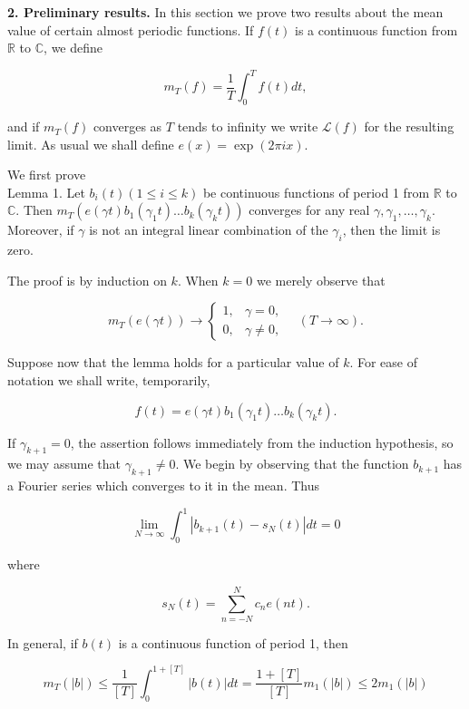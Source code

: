\documentclass[10pt]{article}
\newcommand{\articleSection}[2]{%
  \par\medskip\noindent\textbf{#1. #2.}\enspace
}
\begin{document}
\articleSection{2}{Preliminary results}In this section we prove two results about the mean value of certain almost periodic functions. If $f(t)$ is a continuous function from $\mathbb{R}$ to $\mathbb{C}$, we define

$$
m_{T}(f)=\frac{1}{T} \int_{0}^{T} f(t) d t,
$$

and if $m_{T}(f)$ converges as $T$ tends to infinity we write $\mathcal{L}(f)$ for the resulting limit. As usual we shall define $e(x)=\exp (2 \pi i x)$.

We first prove\\
Lemma 1. Let $b_{i}(t)(1 \leq i \leq k)$ be continuous functions of period 1 from $\mathbb{R}$ to $\mathbb{C}$. Then $m_{T}\left(e(\gamma t) b_{1}\left(\gamma_{1} t\right) \ldots b_{k}\left(\gamma_{k} t\right)\right)$ converges for any real $\gamma, \gamma_{1}, \ldots, \gamma_{k}$. Moreover, if $\gamma$ is not an integral linear combination of the $\gamma_{i}$, then the limit is zero.

The proof is by induction on $k$. When $k=0$ we merely observe that

$$
m_{T}(e(\gamma t)) \rightarrow
\begin{cases}
1, & \gamma=0, \\
0, & \gamma \neq 0,
\end{cases}
\quad(T \rightarrow \infty).
$$

Suppose now that the lemma holds for a particular value of $k$. For ease of notation we shall write, temporarily,

$$
f(t)=e(\gamma t) b_{1}\left(\gamma_{1} t\right) \ldots b_{k}\left(\gamma_{k} t\right) .
$$

If $\gamma_{k+1}=0$, the assertion follows immediately from the induction hypothesis, so we may assume that $\gamma_{k+1}\neq 0$. We begin by observing that the function $b_{k+1}$ has a Fourier series which converges to it in the mean. Thus

$$
\lim _{N \rightarrow \infty} \int_{0}^{1}\left|b_{k+1}(t)-s_{N}(t)\right| d t=0
$$

where


\begin{equation*}
s_{N}(t)=\sum_{n=-N}^{N} c_{n} e(n t). \tag{2.1}
\end{equation*}


In general, if $b(t)$ is a continuous function of period 1, then

$$
m_{T}(|b|) \leq \frac{1}{[T]} \int_{0}^{1+[T]}|b(t)| d t=\frac{1+[T]}{[T]} m_{1}(|b|) \leq 2 m_{1}(|b|)
$$
\end{document}
